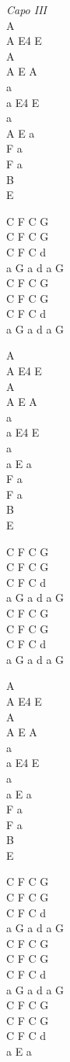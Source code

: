 \begin{chord}
    \textit{Capo III}\\
    A\\
    A E4 E\\
    A\\
    A E A\\
    a\\
    a E4 E\\
    a\\
    A E a\\
    F a\\
    F a\\
    B\\
    E

    C F C G\\
    C F C G\\
    C F C d\\
    a G a d a G\\
    C F C G\\
    C F C G\\
    C F C d\\
    a G a d a G

    A\\
    A E4 E\\
    A\\
    A E A\\
    a\\
    a E4 E\\
    a\\
    a E a\\
    F a\\
    F a\\
    B\\
    E

   C F C G\\
    C F C G\\
    C F C d\\
    a G a d a G\\
    C F C G\\
    C F C G\\
    C F C d\\
    a G a d a G

    A\\
    A E4 E\\
    A\\
    A E A\\
    a\\
    a E4 E\\
    a\\
    a E a\\
    F a\\
    F a\\
    B\\
    E


    C F C G\\
    C F C G\\
    C F C d\\
    a G a d a G\\
    C F C G\\
    C F C G\\
    C F C d\\
    a G a d a G\\
    C F C G\\
    C F C G\\
    C F C d\\
    a E a 
\end{chord}